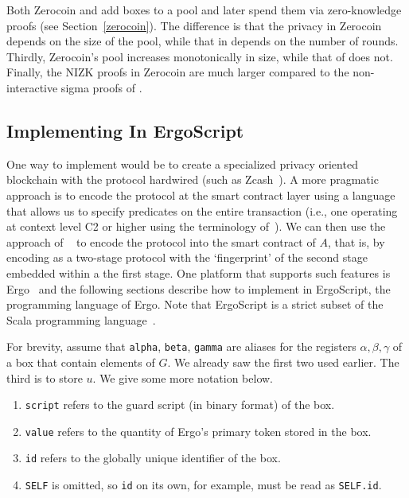 \documentclass[runningheads]{llncs}
\newcommand{\langname}{ErgoScript\xspace}
\newcommand{\zerocoin}{Zerocoin\xspace}
\begin{document}
Both \zerocoin and \algname add boxes to a pool and later spend them via zero-knowledge proofs (see Section~\ref{zerocoin}). 
The difference is that the privacy in \zerocoin depends on the size of the pool, while that in \algname depends on the number of rounds. Thirdly, \zerocoin's pool increases monotonically in size, while that of \algname does not. Finally, the NIZK proofs in \zerocoin are much larger compared to the non-interactive sigma proofs of \algname. 

\subsection{Implementing \algname In \langname}
\label{impl}
One way to implement \algname would be to create a specialized privacy oriented blockchain with the protocol hardwired (such as Zcash~\cite{zcash}). 
A more pragmatic approach is to encode the protocol at the smart contract layer using a language that allows us to specify predicates on the entire transaction (i.e., one operating at context level C2 or higher using the terminology of~\cite{bypassing}). We can then use the approach of ~\cite{multistage} to encode the protocol into the smart contract of $A$, that is, by encoding \algname as a two-stage protocol with the `fingerprint' of the second stage embedded within a the first stage. One platform that supports such features is Ergo~\cite{ergo} and the following sections describe how to implement \algname in \langname, the programming language of Ergo. Note that \langname is a strict subset of the Scala programming language~\cite{odersky2004scala,scalaOdersky}. 
 
For brevity, assume that \texttt{alpha}, \texttt{beta}, \texttt{gamma} are aliases for the registers $\alpha, \beta, \gamma$ of a box that contain elements of $G$. We already saw the first two used earlier. The third is to store $u$. We give some more notation below. 
\begin{enumerate}
    \item \texttt{script} refers to the guard script (in binary format) of the box.
    \item \texttt{value} refers to the quantity of Ergo's primary token stored in the box. 
    \item \texttt{id} refers to the globally unique identifier of the box. 
    \item \texttt{SELF} is omitted, so \texttt{id} on its own, for example, must be read as \texttt{SELF.id}. 
\end{enumerate}
\end{document}
